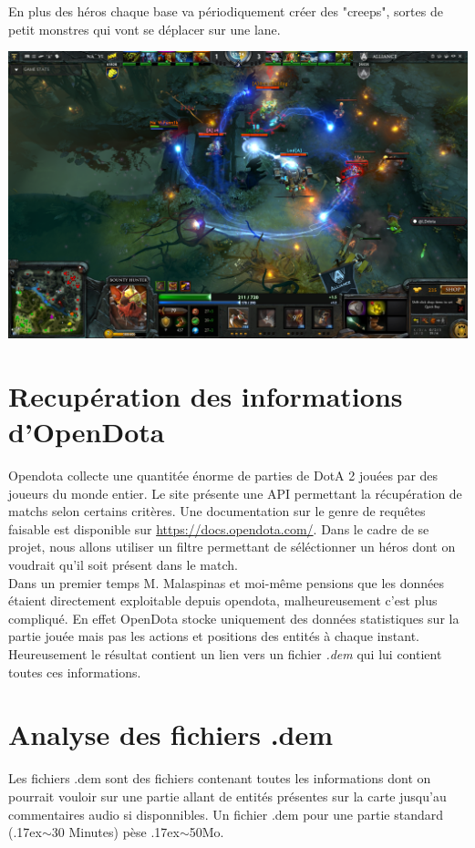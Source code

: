 \documentclass{article}
\begin{document}
En plus des héros chaque base va périodiquement créer des "creeps", sortes de petit monstres qui vont se déplacer sur une lane.

\includegraphics[scale=0.3]{"dota2screen.png"} 

\section{Recupération des informations d'OpenDota}

Opendota collecte une quantitée énorme de parties de DotA 2 jouées par des joueurs du monde entier. Le site présente une API permettant la récupération de matchs selon certains critères. Une documentation sur le genre de requêtes faisable est disponible sur \url{https://docs.opendota.com/}. Dans le cadre de se projet, nous allons utiliser un filtre permettant de séléctionner un héros dont on voudrait qu'il soit présent dans le match.\\
Dans un premier temps M. Malaspinas et moi-même pensions que les données étaient directement exploitable depuis opendota, malheureusement c'est plus compliqué. En effet OpenDota stocke uniquement des données statistiques sur la partie jouée mais pas les actions et positions des entités à chaque instant. Heureusement le résultat contient un lien vers un fichier \textit{.dem} qui lui contient toutes ces informations.

\section{Analyse des fichiers .dem}

Les fichiers .dem sont des fichiers contenant toutes les informations dont on pourrait vouloir sur une partie allant de entités présentes sur la carte jusqu'au commentaires audio si disponnibles. Un fichier .dem pour une partie standard ({\raise.17ex\hbox{$\scriptstyle\mathtt{\sim}$}}30 Minutes) pèse {\raise.17ex\hbox{$\scriptstyle\mathtt{\sim}$}}50Mo.
\end{document}
